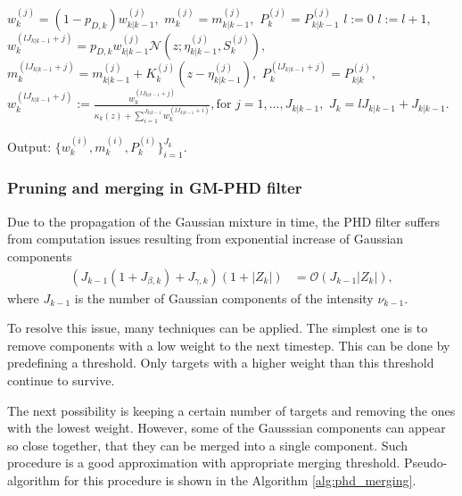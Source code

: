 \begin{algorithm}[h]
\begin{algorithmic}[1]
        \State
         
            \State $w_k^{(j)} = (1 - p_{D,k}) w_{k|k-1}^{(j)},$ \quad
             $m_k^{(j)} = m_{k|k-1}^{(j)},$ \quad
             $P_k^{(j)} = P_{k|k-1}^{(j)}$
        \EndFor
        \State $l:=0$
         
            \State $l:=l+1,$
                \State $w_k^{(l J_{k|k-1} + j)} = p_{D,k} w_{k|k-1}^{(j)} \mathcal{N}(z; \eta_{k|k-1}^{(j)},S_k^{(j)}),$
                \State $m_k^{(l J_{k|k-1} + j)} = m_{k|k-1}^{(j)} + K_k^{(j)} (z - \eta_{k|k-1}^{(j)}),$
                \State $P_k^{(l J_{k|k-1} + j)} = P_{k|k}^{(j)},$
            \EndFor
        \State $w_k^{(l J_{k|k-1} + j)} := \frac{w_k^{(l J_{k|k-1} + j)}}{\kappa_k(z) + \sum_{i=1}^{J_{k|k-1}} w_k^{(
            l J_{k|k-1} + i)}}, \text{for $j = 1,\dots,J_{k|k-1}$},$
        \EndFor
        \State $J_k = l J_{k|k-1} + J_{k|k-1}.$
        \EndProcedure

        \State Output: $\{ w_k^{(i)}, m_k^{(i)}, P_k^{(i)} \}_{i=1}^{J_k}$.
    \end{algorithmic}
    \label{alg:phd}
\end{algorithm}

        \subsubsection{Pruning and merging in GM-PHD filter}
Due to the propagation of the Gaussian mixture in time, the PHD filter suffers from computation issues resulting from
exponential increase of Gaussian components
\begin{align}
(J_{k-1} (1 + J_{\beta,k}) + J_{\gamma,k}) (1 + |Z_k|) &= \mathcal{O}(J_{k-1} |Z_k|),
\end{align}
where $J_{k-1}$ is the number of Gaussian components of the intensity $\nu_{k-1}$.

To resolve this issue, many techniques can be applied. The simplest one is to remove components with a low weight to the next timestep. This can be done by predefining a threshold. Only targets with a higher weight than this threshold continue to survive.

The next possibility is keeping a certain number of targets and removing the ones with the lowest weight. However,
some of the Gausssian components can appear so close together, that they can be merged into a single component. Such
procedure is a good approximation with appropriate merging threshold. Pseudo-algorithm for this procedure is shown in the Algorithm \ref{alg:phd_merging}.

